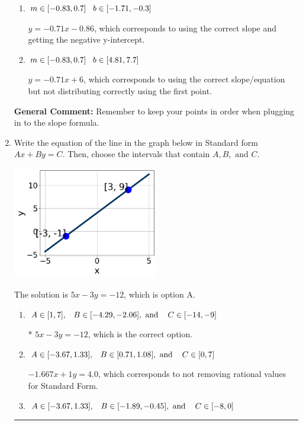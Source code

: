 \documentclass{extbook}[14pt]
\newcommand{\litem}[1]{\item #1

\rule{\textwidth}{0.4pt}}
\begin{document}
\begin{enumerate}
{\begin{enumerate}[label=\Alph*.]
* $y = -0.71x + 0.86$, which is the correct option.
\item \( m \in [-0.83, 0.7] \hspace*{3mm} b \in [-1.71, -0.3] \)

 $y = -0.71x -0.86$, which corresponds to using the correct slope and getting the negative y-intercept.
\item \( m \in [-0.83, 0.7] \hspace*{3mm} b \in [4.81, 7.7] \)

 $y = -0.71x + 6$, which corresponds to using the correct slope/equation but not distributing correctly using the first point.
\end{enumerate}

\textbf{General Comment:} Remember to keep your points in order when plugging in to the slope formula.
}
\litem{
Write the equation of the line in the graph below in Standard form $Ax+By=C$. Then, choose the intervals that contain $A, B, \text{ and } C$.

\begin{center}
    \includegraphics[width=0.5\textwidth]{../Figures/linearGraphToStandardCopyB.png}
\end{center}




The solution is \( 5x - 3y = -12 \), which is option A.\begin{enumerate}[label=\Alph*.]
\item \( A \in [1, 7], \hspace{3mm} B \in [-4.29, -2.06], \text{ and } \hspace{3mm} C \in [-14, -9] \)

* $5x - 3y = -12$, which is the correct option.
\item \( A \in [-3.67, 1.33], \hspace{3mm} B \in [0.71, 1.08], \text{ and } \hspace{3mm} C \in [0, 7] \)

 $-1.667x + 1y = 4.0$, which corresponds to not removing rational values for Standard Form.
\item \( A \in [-3.67, 1.33], \hspace{3mm} B \in [-1.89, -0.45], \text{ and } \hspace{3mm} C \in [-8, 0] \)


\end{enumerate}}
\end{enumerate}
\end{document}
